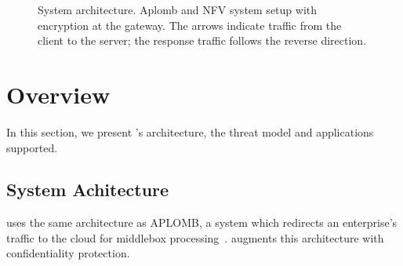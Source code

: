 
\begin{figure}[t!]
\centering
{}
%
\hfill  
{}
     
\caption{System architecture. Aplomb and NFV system setup with \sys encryption  at the gateway. The arrows indicate traffic from the client to the server; the response traffic follows the reverse direction. \label{fig:sys-overview}}
\end{figure}




     
\section{Overview}\label{sec:overview}








In this section, we present \sys's architecture, the threat model and applications supported.


\subsection{System Achitecture}

\sys uses the same  architecture as APLOMB, a system which redirects an enterprise's traffic to the cloud for middlebox processing~\cite{aplomb}. \sys augments this architecture with confidentiality protection.


